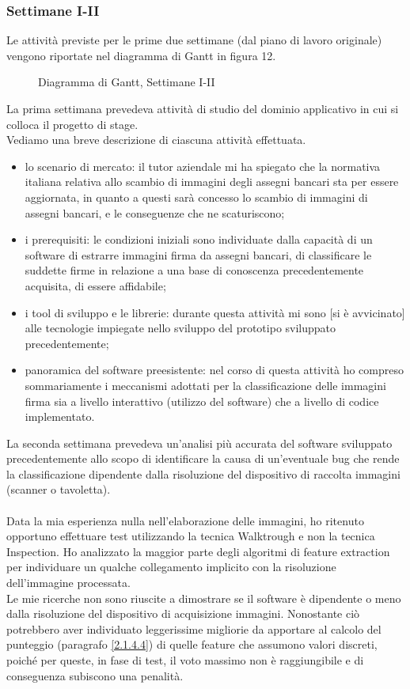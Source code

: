 \subsubsection{Settimane I-II}
\label{3.1.1}
Le attività previste per le prime due settimane (dal piano di lavoro originale) vengono riportate nel diagramma di Gantt in figura 12.
\begin{figure}[H]
\centering
\noindent{}
\caption{Diagramma di Gantt, Settimane I-II}
\end{figure}
La prima settimana prevedeva attività di studio del dominio applicativo in cui si colloca il progetto di stage.\\
Vediamo una breve descrizione di ciascuna attività effettuata.
\begin{itemize}
\item lo scenario di mercato: il tutor aziendale mi ha spiegato che la normativa italiana relativa allo scambio di immagini degli assegni bancari sta per essere aggiornata, in quanto a questi sarà concesso lo scambio di immagini di assegni bancari, e le conseguenze che ne scaturiscono;
\item i prerequisiti: le condizioni iniziali sono individuate dalla capacità di un software di estrarre immagini firma da assegni bancari, di classificare le suddette firme in relazione a una base di conoscenza precedentemente acquisita, di essere affidabile;
\item i tool di sviluppo e le librerie: durante questa attività mi sono [si è avvicinato] alle tecnologie impiegate nello sviluppo del prototipo sviluppato precedentemente;
\item panoramica del software preesistente: nel corso di questa attività ho compreso sommariamente i meccanismi adottati per la classificazione delle immagini firma sia a livello interattivo (utilizzo del software) che a livello di codice implementato.
\end{itemize}
La seconda settimana prevedeva un'analisi più accurata del software sviluppato precedentemente allo scopo di identificare la causa di un'eventuale bug che rende la classificazione dipendente dalla risoluzione del dispositivo di raccolta immagini (scanner o tavoletta).\\\\
Data la mia esperienza nulla nell'elaborazione delle immagini, ho ritenuto opportuno effettuare test utilizzando la tecnica Walktrough e non la tecnica Inspection. Ho analizzato la maggior parte degli algoritmi di feature extraction per individuare un qualche collegamento implicito con la risoluzione dell'immagine processata.\\Le mie ricerche non sono riuscite a dimostrare se il software è dipendente o meno dalla risoluzione del dispositivo di acquisizione immagini. Nonostante ciò potrebbero aver individuato leggerissime migliorie da apportare al calcolo del punteggio (paragrafo \ref{2.1.4.4}) di quelle feature che assumono valori discreti, poiché per queste, in fase di test, il voto massimo non è raggiungibile e di conseguenza subiscono una penalità.
